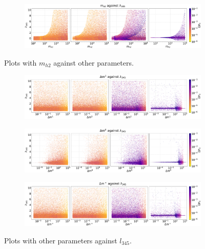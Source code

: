 \documentclass[12pt]{article}
\begin{document}
\begin{figure}[H]
    \begin{subfigure}{\textwidth}
      \centering
      \includegraphics[width=1\columnwidth]{4plot/MD2_l345.pdf}
    \end{subfigure}
\caption{Plots with $m_{h2}$ against other parameters.}
\end{figure}

\begin{figure}[H]
    \begin{subfigure}{\textwidth}
      \centering
      \includegraphics[width=1\columnwidth]{4plot/DM2_l345.pdf}
    \end{subfigure}

    \begin{subfigure}{\textwidth}
      \centering
      \includegraphics[width=1\columnwidth]{4plot/DM3_l345.pdf}
    \end{subfigure}
    
    \begin{subfigure}{\textwidth}
      \centering
      \includegraphics[width=1\columnwidth]{4plot/DMP_l345.pdf}
    \end{subfigure}
    
\caption{Plots with other parameters against $l_{345}$.}
\end{figure}

\newpage
\twocolumn
\end{document}
